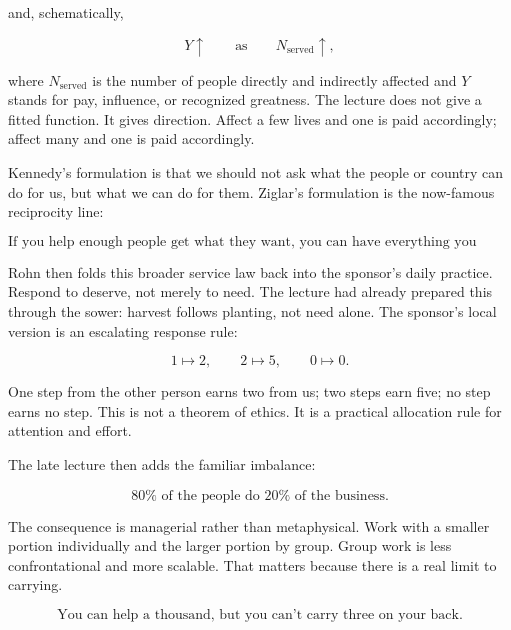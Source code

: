 and, schematically,

\begin{equation}
Y \uparrow \qquad \text{as} \qquad N_{\mathrm{served}} \uparrow,
\end{equation}

where \(N_{\mathrm{served}}\) is the number of people directly and indirectly affected and \(Y\) stands for pay, influence, or recognized greatness. The lecture does not give a fitted function. It gives direction. Affect a few lives and one is paid accordingly; affect many and one is paid accordingly.

Kennedy's formulation is that we should not ask what the people or country can do for us, but what we can do for them. Ziglar's formulation is the now-famous reciprocity line:

\begin{equation}
\text{If you help enough people get what they want, you can have everything you want.}
\end{equation}

Rohn then folds this broader service law back into the sponsor's daily practice. Respond to deserve, not merely to need. The lecture had already prepared this through the sower: harvest follows planting, not need alone. The sponsor's local version is an escalating response rule:

\begin{equation}
1 \mapsto 2,\qquad 2 \mapsto 5,\qquad 0 \mapsto 0.
\end{equation}

One step from the other person earns two from us; two steps earn five; no step earns no step. This is not a theorem of ethics. It is a practical allocation rule for attention and effort.

The late lecture then adds the familiar imbalance:

\begin{equation}
80\% \text{ of the people do } 20\% \text{ of the business.}
\end{equation}

The consequence is managerial rather than metaphysical. Work with a smaller portion individually and the larger portion by group. Group work is less confrontational and more scalable. That matters because there is a real limit to carrying.

\begin{equation}
\text{You can help a thousand, but you can't carry three on your back.}
\end{equation}


